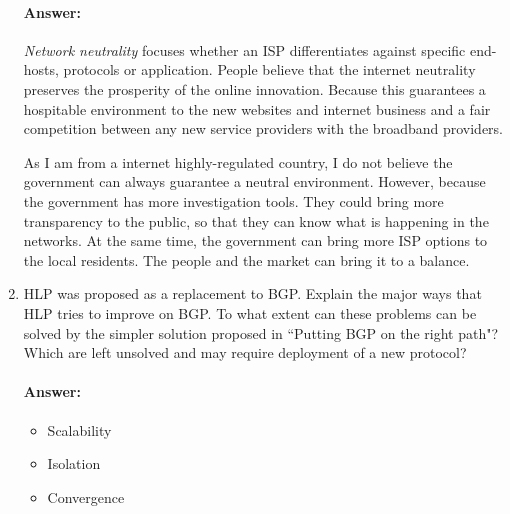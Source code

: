 \documentclass[a4paper,11pt]{article}
\theoremstyle{mytheor}
\begin{document}
\begin{enumerate}
\paragraph{Answer:}
\emph{Network neutrality} focuses whether an ISP differentiates against specific end-hosts, protocols or application.
People believe that the internet neutrality preserves the prosperity of the online innovation.
Because this guarantees a hospitable environment to the new websites and internet business and a fair competition between any new service providers with the broadband providers.

As I am from a internet highly-regulated country, I do not believe the government can always guarantee a neutral environment.
However, because the government has more investigation tools. 
They could bring more transparency to the public, so that they can know what is happening in the networks.
At the same time, the government can bring more ISP options to the local residents.
The people and the market can bring it to a balance.

\item
HLP was proposed as a replacement to BGP. 
Explain the major ways that HLP tries to improve on BGP. 
To what extent can these problems can be solved by the simpler solution proposed in ``Putting BGP on the
right path"? 
Which are left unsolved and may require deployment of a new protocol?
\paragraph{Answer:}
\begin{itemize}
\item Scalability
\item Isolation
\item Convergence
\end{itemize}

\end{enumerate}
\end{document}
